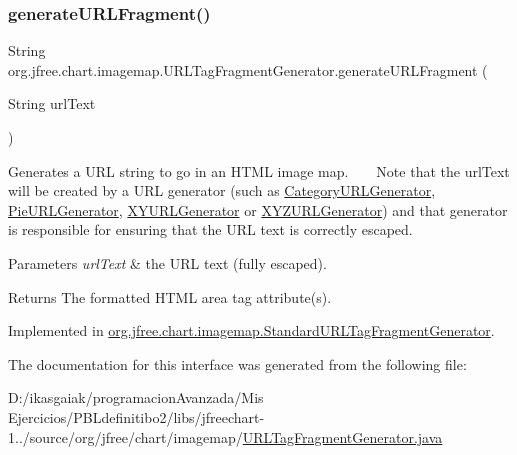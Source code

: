 \subsubsection{\texorpdfstring{generate\+U\+R\+L\+Fragment()}{generateURLFragment()}}
{\footnotesize\ttfamily String org.\+jfree.\+chart.\+imagemap.\+U\+R\+L\+Tag\+Fragment\+Generator.\+generate\+U\+R\+L\+Fragment (\begin{DoxyParamCaption}\item[{String}]{url\+Text }\end{DoxyParamCaption})}

Generates a U\+RL string to go in an H\+T\+ML image map. ~\newline
~\newline
 Note that the {\ttfamily url\+Text} will be created by a U\+RL generator (such as \mbox{\hyperlink{}{Category\+U\+R\+L\+Generator}}, \mbox{\hyperlink{}{Pie\+U\+R\+L\+Generator}}, \mbox{\hyperlink{}{X\+Y\+U\+R\+L\+Generator}} or \mbox{\hyperlink{}{X\+Y\+Z\+U\+R\+L\+Generator}}) and that generator is responsible for ensuring that the U\+RL text is correctly escaped.


\begin{DoxyParams}{Parameters}
{\em url\+Text} & the U\+RL text (fully escaped).\\
\hline
\end{DoxyParams}
\begin{DoxyReturn}{Returns}
The formatted H\+T\+ML area tag attribute(s). 
\end{DoxyReturn}


Implemented in \mbox{\hyperlink{classorg_1_1jfree_1_1chart_1_1imagemap_1_1_standard_u_r_l_tag_fragment_generator_a122e66d4498e56e6581ac4b0949caf3b}{org.\+jfree.\+chart.\+imagemap.\+Standard\+U\+R\+L\+Tag\+Fragment\+Generator}}.



The documentation for this interface was generated from the following file\+:\begin{DoxyCompactItemize}
\item 
D\+:/ikasgaiak/programacion\+Avanzada/\+Mis Ejercicios/\+P\+B\+Ldefinitibo2/libs/jfreechart-\/1../source/org/jfree/chart/imagemap/\mbox{\hyperlink{_u_r_l_tag_fragment_generator_8java}{U\+R\+L\+Tag\+Fragment\+Generator.\+java}}\end{DoxyCompactItemize}
